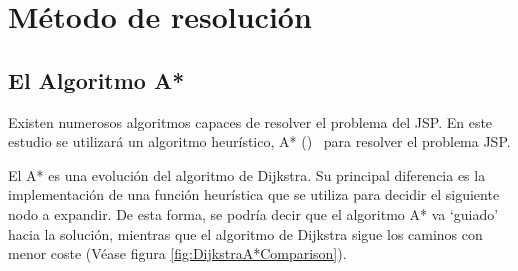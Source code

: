 
\section{Método de resolución}

\subsection{El Algoritmo A*}
\label{ssec:AlgoritmoA*}

Existen numerosos algoritmos capaces de resolver el problema del JSP\@.
En este estudio se utilizará un algoritmo heurístico, A* ()~\cite{HNR68}
para resolver el problema JSP\@.

El A* es una evolución del algoritmo de Dijkstra.
Su principal diferencia es la implementación de una función heurística
que se utiliza para decidir el siguiente nodo a expandir.
De esta forma, se podría decir que el algoritmo A* va `guiado'
hacia la solución, mientras que el algoritmo de Dijkstra
sigue los caminos con menor coste (Véase figura \ref{fig:DijkstraA*Comparison}).

